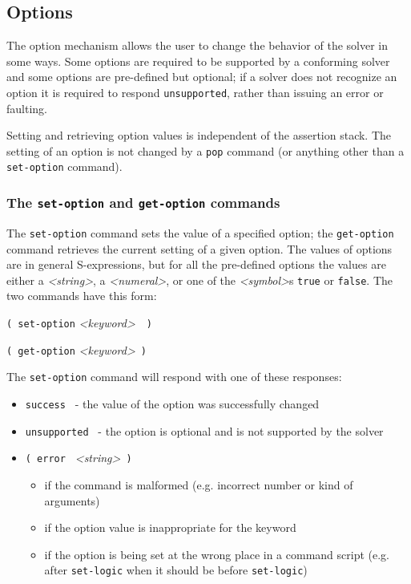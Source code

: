\documentclass[12pt,oneside]{report}
\newcommand{\keyword}{{\it <keyword>}}
\newcommand{\sym}{{\it <symbol>}}
\newcommand{\numeral}{{\it <numeral>}}
\newcommand{\strng}{{\it <string>}} %
\newcommand{\nospace}{\setlength{\itemsep}{0in}\setlength{\parsep}{0in}\setlength{\parskip}{0in}\setlength{\topsep}{0in}}
\begin{document}
\subsection{Options}
\label{Options}
The option mechanism allows the user to change the behavior of the solver in some ways.  Some options are required to be supported by a conforming solver and some options are pre-defined but optional; if a solver does not recognize an option it is required to respond {\tt unsupported}, rather than issuing an error or faulting.

Setting and retrieving option values is independent of the assertion stack. The setting of an option is not changed by a {\tt pop} command (or anything other than a {\tt set-option} command).

\subsubsection{The {\tt set-option} and {\tt get-option} commands}

The {\tt set-option} command sets the value of a specified option; the {\tt get-option} command retrieves the current setting of a given option.  The values of options are in general S-expressions, but for all the pre-defined options the values are
 either a \strng, a \numeral, or one of the \sym s {\tt true} or {\tt false}. The two commands have this form:\\
\centerline{{\tt ( set-option} \keyword\ {\it <attr-value>}\ {\tt )}}
\centerline{{\tt ( get-option} \keyword\ {\tt )  }}

The {\tt set-option} command will respond with one of these responses:
\begin{itemize} \nospace
\item[] {\tt success } - the value of the option was successfully changed
\item[] {\tt unsupported } - the option is optional and is not supported by the solver
\item[] {\tt ( error } \strng~{\tt )}
\begin{itemize} \nospace
\item if the command is malformed (e.g. incorrect number or kind of arguments)
\item if the option value is inappropriate for the keyword
\item if the option is being set at the wrong place in a command script (e.g. after {\tt set-logic} when it should be before {\tt set-logic})
\end{itemize}
\end{itemize}
\end{document}
